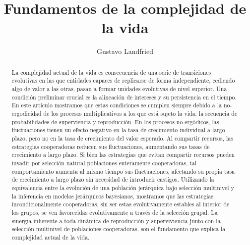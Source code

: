 \documentclass[a4paper,10pt]{article}
\title{Fundamentos de la complejidad de la vida}
\author{Gustavo Landfried}
\begin{document}
\maketitle

\begin{abstract}
La complejidad actual de la vida es consecuencia de una serie de transiciones evolutivas en las que entidades capaces de replicarse de forma independiente, cediendo algo de valor a las otras, pasan a formar unidades evolutivas de nivel superior.
Una condición preliminar crucial es la alineación de intereses y su persistencia en el tiempo.
En este artículo mostramos que estas condiciones se cumplen siempre debido a la no-ergodicidad de los procesos multiplicativos a los que está sujeto la vida: la secuencia de probabilidades de superviencia y reproducción.
En los procesos no-ergódicos, las fluctuaciones tienen un efecto negativo en la tasa de crecimiento individual a largo plazo, pero no en la tasa de crecimiento del valor esperado.
Al compartir recursos, las estrategias cooperadoras reducen sus fluctuaciones, aumentando sus tasas de crecimiento a largo plazo.
Si bien las estrategias que evitan compartir recursos pueden invadir por selección natural poblaciones enteramente cooperadoras, tal comportamiento aumenta al mismo tiempo sus fluctuaciones, afectando su propia tasa de crecimiento a largo plazo sin necesidad de introducir castigos.
Utilizando la equivalencia entre la evolución de una población jerárquica bajo selección multinivel y la inferencia en modelos jerárquicos bayesianos, mostramos que las estrategias incondicionalmente cooperadoras, sin ser estas evolutivamente estables al interior de los grupos, se ven favorecidas evolutivamente a través de la selección grupal.
La sinergia inherente a toda dinámica de reproducción y superviviencia junto con la selección multinivel de poblaciones cooperadoras, son el fundamento que explica la complejidad actual de la vida.
\end{abstract}
\end{document}
